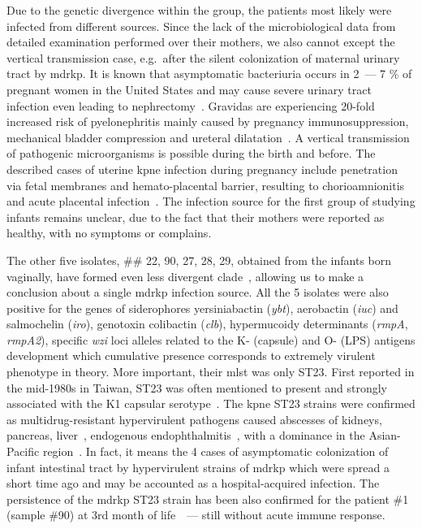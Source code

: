 Due to the genetic divergence within the group, the patients most likely were infected from different sources.
Since the lack of the microbiological data from detailed examination performed over their mothers, we also cannot except
the vertical transmission case, e.g.\ after the silent colonization of maternal urinary tract by \gls{mdrkp}.
It is known that asymptomatic bacteriuria occurs in 2~--- 7 \% of pregnant women in the United States
and may cause severe urinary tract infection even leading to nephrectomy~\cite{Kim2018}.
Gravidas are experiencing 20-fold increased risk of pyelonephritis mainly caused by pregnancy immunosuppression,
mechanical bladder compression and ureteral dilatation~\cite{Farkash2012}.
A vertical transmission of pathogenic microorganisms is possible during the birth and before.
The described cases of uterine \gls{kpne} infection during pregnancy include penetration via fetal membranes and
hemato-placental barrier, resulting to chorioamnionitis~\cite{Oh2017} and acute placental infection~\cite{Sheikh2005}.
The infection source for the first group of studying infants remains unclear, due to the fact that their mothers
were reported as healthy, with no symptoms or complains.

The other five isolates, \#\# 22, 90, 27, 28, 29, obtained from the infants born vaginally, have formed even less
divergent clade~, allowing us to make a conclusion about a single \gls{mdrkp} infection source.
All the 5 isolates were also positive for the genes of siderophores yersiniabactin (\textit{ybt}),
aerobactin (\textit{iuc}) and salmochelin (\textit{iro}), genotoxin colibactin (\textit{clb}),
hypermucoidy determinants (\textit{rmpA}, \textit{rmpA2}), specific \textit{wzi} loci alleles related to the
K- (capsule) and O- (LPS) antigens development which cumulative presence corresponds to extremely virulent phenotype
in theory.
More important, their \gls{mlst} was only ST23.
First reported in the mid-1980s in Taiwan, ST23 was often mentioned to present and strongly associated with the
K1 capsular serotype~\cite{Shon2013}.
The \gls{kpne} ST23 strains were confirmed as multidrug-resistant hypervirulent pathogens
caused abscesses of kidneys, pancreas, liver~\cite{Shen2019}, endogenous endophthalmitis~\cite{Xu2018},
with a dominance in the Asian-Pacific region~\cite{Thiry2019}.
In fact, it means the 4 cases of asymptomatic colonization of infant intestinal tract by hypervirulent strains of
\gls{mdrkp} which were spread a short time ago and may be accounted as a hospital-acquired infection.
The persistence of the \gls{mdrkp} ST23 strain has been also confirmed for the patient \#1 (sample \#90)
at 3rd month of life~~--- still without acute immune response.

